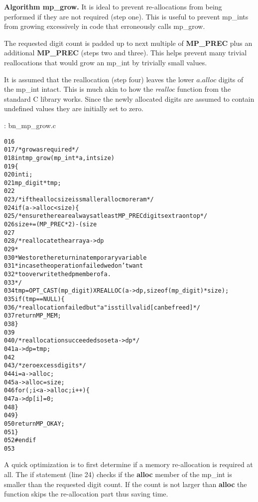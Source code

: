 \documentclass[b5paper]{book}
\begin{document}
\textbf{Algorithm mp\_grow.}
It is ideal to prevent re-allocations from being performed if they are not required (step one).  This is useful to 
prevent mp\_ints from growing excessively in code that erroneously calls mp\_grow.  

The requested digit count is padded up to next multiple of \textbf{MP\_PREC} plus an additional \textbf{MP\_PREC} (steps two and three).  
This helps prevent many trivial reallocations that would grow an mp\_int by trivially small values.  

It is assumed that the reallocation (step four) leaves the lower $a.alloc$ digits of the mp\_int intact.  This is much 
akin to how the \textit{realloc} function from the standard C library works.  Since the newly allocated digits are 
assumed to contain undefined values they are initially set to zero.

\vspace{+3mm}\begin{small}
\hspace{-5.1mm}{\bf File}: bn\_mp\_grow.c
\vspace{-3mm}
\begin{alltt}
016   
017   /* grow as required */
018   int mp_grow (mp_int * a, int size)
019   \{
020     int     i;
021     mp_digit *tmp;
022   
023     /* if the alloc size is smaller alloc more ram */
024     if (a->alloc < size) \{
025       /* ensure there are always at least MP_PREC digits extra on top */
026       size += (MP_PREC * 2) - (size % MP_PREC);
027   
028       /* reallocate the array a->dp
029        *
030        * We store the return in a temporary variable
031        * in case the operation failed we don't want
032        * to overwrite the dp member of a.
033        */
034       tmp = OPT_CAST(mp_digit) XREALLOC (a->dp, sizeof (mp_digit) * size);
035       if (tmp == NULL) \{
036         /* reallocation failed but "a" is still valid [can be freed] */
037         return MP_MEM;
038       \}
039   
040       /* reallocation succeeded so set a->dp */
041       a->dp = tmp;
042   
043       /* zero excess digits */
044       i        = a->alloc;
045       a->alloc = size;
046       for (; i < a->alloc; i++) \{
047         a->dp[i] = 0;
048       \}
049     \}
050     return MP_OKAY;
051   \}
052   #endif
053   
\end{alltt}
\end{small}

A quick optimization is to first determine if a memory re-allocation is required at all.  The if statement (line 24) checks
if the \textbf{alloc} member of the mp\_int is smaller than the requested digit count.  If the count is not larger than \textbf{alloc}
the function skips the re-allocation part thus saving time.
\end{document}
